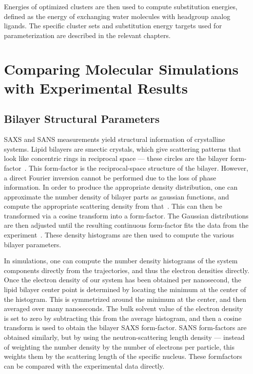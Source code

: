 Energies of optimized clusters are then used to compute substitution
energies, defined as the energy of exchanging water molecules
with headgroup analog ligands. The specific cluster sets and substitution
energy targets used for parameterization are described in the relevant
chapters.

\section{Comparing Molecular Simulations with Experimental Results}
\subsection{Bilayer Structural Parameters}
SAXS and SANS measurements yield structural information of crystalline systems.
Lipid bilayers are smectic crystals, which give scattering
patterns that look like concentric rings in reciprocal space --- these circles are the bilayer form-factor~\cite{nagle:2000}. This form-factor
is the reciprocal-space structure of the bilayer. 
However, a direct Fourier inversion cannot be performed due to the loss of phase information.
In order to produce the appropriate density distribution, one can approximate the number density of bilayer parts as gaussian functions, and 
compute the appropriate scattering density from that~\cite{nagle:2000,fogarty:2015}. This can then be transformed via a cosine transform
into a form-factor. The Gaussian distributions are then adjusted
until the resulting continuous form-factor fits the data from the experiment~\cite{nagle:2000,fogarty:2015}. These density histograms are then used to compute the various bilayer parameters.

In simulations, one can compute the number density histograms of the system components
directly from the trajectories, and thus the electron densities directly. Once the electron density of our system has been obtained
per nanosecond, the lipid bilayer center point is determined by locating the minimum at the center of the 
histogram. This is symmetrized around the minimum at the center, and then averaged over many nanoseconds.
The bulk solvent value of the electron density is set to zero by subtracting this from the average histogram, and then a cosine transform is used 
to obtain the bilayer SAXS form-factor. SANS form-factors are obtained similarly, but by using the neutron-scattering length density --- instead of weighting the number density 
by the number of electrons per particle, this weights them by the scattering length of the specific nucleus.
These formfactors can be compared with the experimental data directly.

